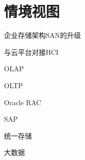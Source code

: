 \chapter{情境视图}

\begin{enumbox}
\item 企业存储架构SAN的升级
\item 与云平台对接HCI
\item OLAP
\item OLTP
\item Oracle RAC
\item SAP
\item 统一存储
\item 大数据
\end{enumbox}
